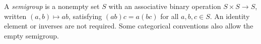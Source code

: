 
A \emph{semigroup} is a nonempty set $S$ with an associative binary operation $S\times S\to S$, written $(a,b)\mapsto ab$, satisfying $(ab)c=a(bc)$ for all $a,b,c\in S$. An identity element or inverses are not required. Some categorical conventions also allow the empty semigroup.
